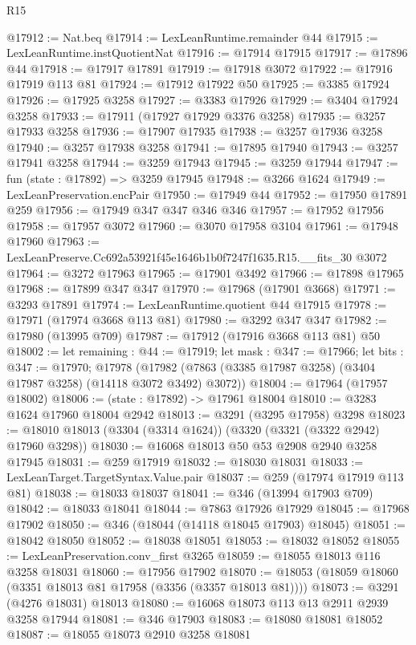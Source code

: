 \begin{lexlean}{R15}
\begin{coremodule}
@17912 := Nat.beq
@17914 := LexLeanRuntime.remainder @44
@17915 := LexLeanRuntime.instQuotientNat
@17916 := @17914 @17915
@17917 := @17896 @44
@17918 := @17917 @17891
@17919 := @17918 @3072
@17922 := @17916 @17919 @113 @81
@17924 := @17912 @17922 @50
@17925 := @3385 @17924
@17926 := @17925 @3258
@17927 := @3383 @17926
@17929 := @3404 @17924 @3258
@17933 := @17911 (@17927 @17929 @3376 @3258)
@17935 := @3257 @17933 @3258
@17936 := @17907 @17935
@17938 := @3257 @17936 @3258
@17940 := @3257 @17938 @3258
@17941 := @17895 @17940
@17943 := @3257 @17941 @3258
@17944 := @3259 @17943
@17945 := @3259 @17944
@17947 := fun (state : @17892) => @3259 @17945
@17948 := @3266 @1624
@17949 := LexLeanPreservation.encPair
@17950 := @17949 @44
@17952 := @17950 @17891 @259
@17956 := @17949 @347 @347 @346 @346
@17957 := @17952 @17956
@17958 := @17957 @3072
@17960 := @3070 @17958 @3104
@17961 := @17948 @17960
@17963 := LexLeanPreserve.Cc692a53921f45e1646b1b0f7247f1635.R15.__fits_30 @3072
@17964 := @3272 @17963
@17965 := @17901 @3492
@17966 := @17898 @17965
@17968 := @17899 @347 @347
@17970 := @17968 (@17901 @3668)
@17971 := @3293 @17891
@17974 := LexLeanRuntime.quotient @44 @17915
@17978 := @17971 (@17974 @3668 @113 @81)
@17980 := @3292 @347 @347
@17982 := @17980 (@13995 @709)
@17987 := @17912 (@17916 @3668 @113 @81) @50
@18002 := let remaining : @44 := @17919;
  let mask : @347 := @17966;
  let bits : @347 := @17970;
  @17978 (@17982 (@7863 (@3385 @17987 @3258) (@3404 @17987 @3258) (@14118 @3072 @3492) @3072))
@18004 := @17964 (@17957 @18002)
@18006 := (state : @17892) -> @17961 @18004
@18010 := @3283 @1624 @17960 @18004 @2942
@18013 := @3291 (@3295 @17958) @3298
@18023 := @18010 @18013 (@3304 (@3314 @1624)) (@3320 (@3321 (@3322 @2942) @17960 @3298))
@18030 := @16068 @18013 @50 @53 @2908 @2940 @3258 @17945
@18031 := @259 @17919
@18032 := @18030 @18031
@18033 := LexLeanTarget.TargetSyntax.Value.pair
@18037 := @259 (@17974 @17919 @113 @81)
@18038 := @18033 @18037
@18041 := @346 (@13994 @17903 @709)
@18042 := @18033 @18041
@18044 := @7863 @17926 @17929
@18045 := @17968 @17902
@18050 := @346 (@18044 (@14118 @18045 @17903) @18045)
@18051 := @18042 @18050
@18052 := @18038 @18051
@18053 := @18032 @18052
@18055 := LexLeanPreservation.conv_first @3265
@18059 := @18055 @18013 @116 @3258 @18031
@18060 := @17956 @17902
@18070 := @18053 (@18059 @18060 (@3351 @18013 @81 @17958 (@3356 (@3357 @18013 @81))))
@18073 := @3291 (@4276 @18031) @18013
@18080 := @16068 @18073 @113 @13 @2911 @2939 @3258 @17944
@18081 := @346 @17903
@18083 := @18080 @18081 @18052
@18087 := @18055 @18073 @2910 @3258 @18081

\end{coremodule}
\end{lexlean}

